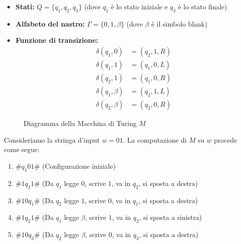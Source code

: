 \documentclass[a4paper]{article}
\theoremstyle{definition} %
\theoremstyle{remark} %
\begin{document}
\begin{itemize}
    \item \textbf{Stati:} $Q = \{q_1, q_2, q_3\}$ (dove $q_1$ è lo stato iniziale e $q_3$ è lo stato finale)
    \item \textbf{Alfabeto del nastro:} $\Gamma = \{0, 1, \beta\}$ (dove $\beta$ è il simbolo blank)
    \item \textbf{Funzione di transizione:}
    \begin{align}
        \delta(q_1, 0) &= (q_2, 1, R) \\
        \delta(q_1, 1) &= (q_1, 0, L) \\
        \delta(q_2, 1) &= (q_1, 0, R) \\
        \delta(q_1, \beta) &= (q_2, 1, L) \\
        \delta(q_2, \beta) &= (q_3, 0, R)
    \end{align}
\end{itemize}

\begin{figure}[h]
\centering
{}
\caption{Diagramma della Macchina di Turing $M$}
\end{figure}

Consideriamo la stringa d'input $w = 01$. La computazione di $M$ su $w$ procede come segue:

\begin{enumerate}
    \item $\#q_1 01\#$ \quad (Configurazione iniziale)
    \item $\#1q_2 1\#$ \quad (Da $q_1$ legge $0$, scrive $1$, va in $q_2$, si sposta a destra)
    \item $\#10q_1 \#$ \quad (Da $q_2$ legge $1$, scrive $0$, va in $q_1$, si sposta a destra)
    \item $\#1q_2 1\#$ \quad (Da $q_1$ legge $\beta$, scrive $1$, va in $q_2$, si sposta a sinistra)
    \item $\#10q_3 \#$ \quad (Da $q_2$ legge $\beta$, scrive $0$, va in $q_3$, si sposta a destra)
\end{enumerate}
\end{document}
